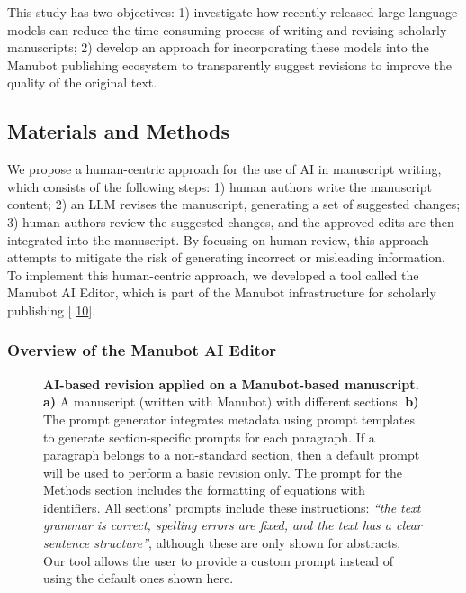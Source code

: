\documentclass[
]{article}
\providecommand{\DIFaddbegin}{} %
\providecommand{\DIFaddend}{} %
\providecommand{\DIFdelbegin}{} %
\providecommand{\DIFdelend}{} %
\newcommand{\DIFscaledelfig}{0.5}
\newlength{\DIFdelgraphicswidth} %
\newlength{\DIFdelgraphicsheight} %
\newcommand{\DIFaddincludegraphics}[2][]{{\color{blue}\fbox{\DIFOincludegraphics[#1]{#2}}}} %
\newcommand{\DIFdelincludegraphics}[2][]{%
\sbox{\DIFdelgraphicsbox}{\DIFOincludegraphics[#1]{#2}}%
\settoboxwidth{\DIFdelgraphicswidth}{\DIFdelgraphicsbox} %
\settoboxtotalheight{\DIFdelgraphicsheight}{\DIFdelgraphicsbox} %
\scalebox{\DIFscaledelfig}{%
\parbox[b]{\DIFdelgraphicswidth}{\usebox{\DIFdelgraphicsbox}\\[-\baselineskip] \rule{\DIFdelgraphicswidth}{0em}}\llap{\resizebox{\DIFdelgraphicswidth}{\DIFdelgraphicsheight}{%
\setlength{\unitlength}{\DIFdelgraphicswidth}%
\begin{picture}(1,1)%
\thicklines\linethickness{2pt} %
{\color[rgb]{1,0,0}\put(0,0){\framebox(1,1){}}}%
{\color[rgb]{1,0,0}\put(0,0){\line( 1,1){1}}}%
{\color[rgb]{1,0,0}\put(0,1){\line(1,-1){1}}}%
\end{picture}%
}\hspace*{3pt}}} %
} %
\DeclareRobustCommand{\DIFaddbegin}{\DIFOaddbegin \let\includegraphics\DIFaddincludegraphics} %
\DeclareRobustCommand{\DIFaddend}{\DIFOaddend \let\includegraphics\DIFOincludegraphics} %
\DeclareRobustCommand{\DIFdelbegin}{\DIFOdelbegin \let\includegraphics\DIFdelincludegraphics} %
\DeclareRobustCommand{\DIFdelend}{\DIFOaddend \let\includegraphics\DIFOincludegraphics} %
\begin{document}
This study has two objectives:
1) investigate how recently released large language models can reduce the time-consuming process of writing and revising scholarly manuscripts;
2) develop an approach for incorporating these models into the Manubot publishing ecosystem to transparently suggest revisions to improve the quality of the original text.

\subsection{Materials and Methods}

We propose a human-centric approach for the use of AI in manuscript writing, which consists of the following steps:
1) human authors write the manuscript content;
2) an LLM revises the manuscript, generating a set of suggested changes;
3) human authors review the suggested changes, and the approved edits are then integrated into the manuscript.
By focusing on human review, this approach attempts to mitigate the risk of generating incorrect or misleading information.
To implement this human-centric approach, we developed a tool called the Manubot AI Editor, which is part of the Manubot infrastructure for scholarly publishing {[}\protect\DIFdelbegin %
\DIFdelend \DIFaddbegin \hyperlink{ref-YuJbg3zO}{10}{]}\DIFaddend .

\subsubsection{Overview of the Manubot AI Editor}

\begin{figure}
\hypertarget{fig:ai_revision}{%
\centering

\caption{\textbf{AI-based revision applied on a Manubot-based manuscript.}
\textbf{a)} A manuscript (written with Manubot) with different sections.
\textbf{b)} The prompt generator integrates metadata using prompt templates to generate section-specific prompts for each paragraph.
If a paragraph belongs to a non-standard section, then a default prompt will be used to perform a basic revision only.
The prompt for the Methods section includes the formatting of equations with identifiers.
All sections' prompts include these instructions: \emph{``the text grammar is correct, spelling errors are fixed, and the text has a clear sentence structure''}, although these are only shown for abstracts.
Our tool allows the user to provide a custom prompt instead of using the default ones shown here.}\label{fig:ai_revision}
}
\end{figure}
\end{document}
